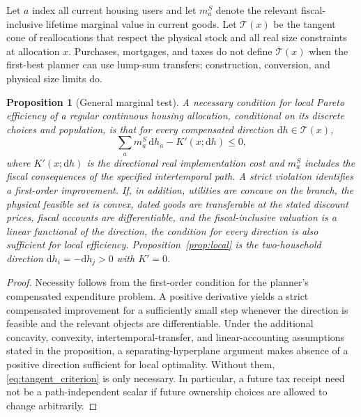 \documentclass[11pt]{article}
\newtheorem{proposition}{Proposition}
\newcommand{\dd}{\mathrm d}
\newcommand{\1}{\mathbf 1}
\begin{document}
Let $a$ index all current housing users and let $m_a^S$ denote the relevant
fiscal-inclusive lifetime marginal value in current goods. Let
$\mathcal T(x)$ be the tangent cone of reallocations that respect the physical
stock and all real size constraints at allocation $x$. Purchases, mortgages,
and taxes do not define $\mathcal T(x)$ when the first-best planner can use
lump-sum transfers; construction, conversion, and physical size limits do.

\begin{proposition}[General marginal test]
\label{prop:tangent}
A necessary condition for local Pareto efficiency of a regular continuous
housing allocation, conditional on its discrete choices and population, is
that for every compensated direction $\dd h\in\mathcal T(x)$,
\begin{equation}
\sum_a m_a^S\,\dd h_a-K'(x;\dd h)\le0,
\label{eq:tangent_criterion}
\end{equation}
where $K'(x;\dd h)$ is the directional real implementation cost and $m_a^S$
includes the fiscal consequences of the \emph{specified intertemporal path}.
A strict violation identifies a first-order improvement. If, in addition,
utilities are concave on the branch, the physical feasible set is convex,
dated goods are transferable at the stated discount prices, fiscal accounts
are differentiable, and the fiscal-inclusive valuation is a linear functional
of the direction, the condition for every direction is also sufficient for
local efficiency. Proposition~\ref{prop:local} is the two-household direction
$\dd h_i=-\dd h_j>0$ with $K'=0$.
\end{proposition}

\begin{proof}
Necessity follows from the first-order condition for the planner's compensated
expenditure problem. A positive derivative yields a strict compensated
improvement for a sufficiently small step whenever the direction is feasible
and the relevant objects are differentiable. Under the additional concavity,
convexity, intertemporal-transfer, and linear-accounting assumptions stated in
the proposition, a separating-hyperplane argument makes absence of a positive
direction sufficient for local optimality. Without them,
\eqref{eq:tangent_criterion} is only necessary. In particular, a future tax
receipt need not be a path-independent scalar if future ownership choices are
allowed to change arbitrarily.
\end{proof}

\end{document}
